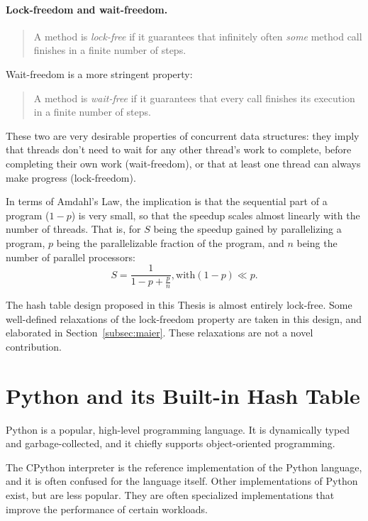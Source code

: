 \paragraph{Lock-freedom and wait-freedom.}
\begin{quote}
    A method is \emph{lock-free} if it guarantees that infinitely often \emph{some} method call finishes in a finite number of steps.
\end{quote}
Wait-freedom is a more stringent property:
\begin{quote}
    A method is \emph{wait-free} if it guarantees that every call finishes its execution in a finite number of steps.
\end{quote}

These two are very desirable properties of concurrent data structures: they imply that threads don't need to wait for any other thread's work to complete, before completing their own work (wait-freedom), or that at least one thread can always make progress (lock-freedom).

In terms of Amdahl's Law, the implication is that the sequential part of a program ($1 - p$) is very small, so that the speedup scales almost linearly with the number of threads.
That is, for $S$ being the speedup gained by parallelizing a program, $p$ being the parallelizable fraction of the program, and $n$ being the number of parallel processors:
\[
    S = \frac{1}{1 - p + \frac{p}{n}}, \text{with} (1 - p) \ll p.
\]

The hash table design proposed in this Thesis is almost entirely lock-free.
Some well-defined relaxations of the lock-freedom property are taken in this design, and elaborated in Section~\ref{subsec:maier}.
These relaxations are not a novel contribution.


\section{Python and its Built-in Hash Table}\label{sec:dict-intro}

Python is a popular, high-level programming language.
It is dynamically typed and garbage-collected, and it chiefly supports object-oriented programming.

The CPython interpreter is the reference implementation of the Python language, and it is often confused for the language itself.
Other implementations of Python exist, but are less popular.
They are often specialized implementations that improve the performance of certain workloads.

